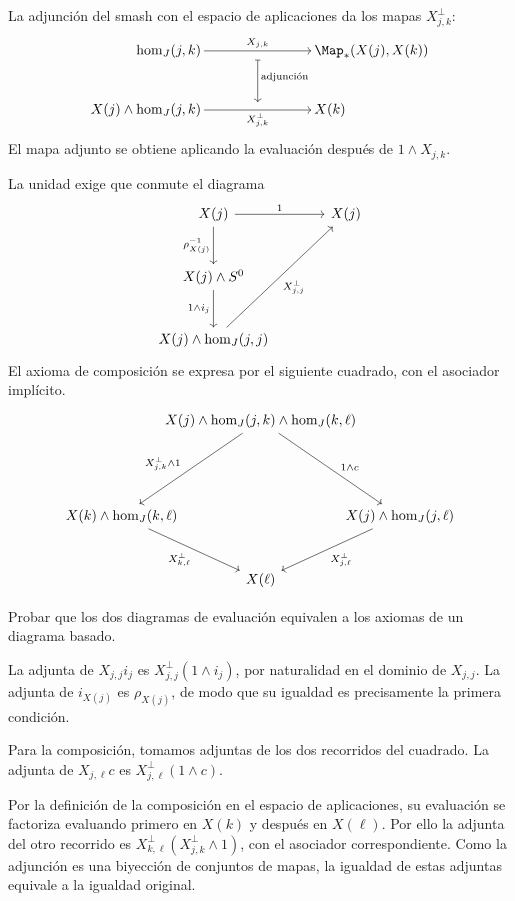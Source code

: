 La adjunción del smash con el espacio de aplicaciones da los mapas $X_{j,k}^\perp$:
\[
\begin{tikzcd}[column sep={13.5mm,between origins},row sep={15mm,between origins},
    cells={nodes={inner sep=2pt}}]
|[anchor=east]| \hom_J(j,k)\arrow[rr,start anchor=east,end anchor=west,"X_{j,k}"]
& {}\arrow[d,mapsto,start anchor=center,end anchor=center,shorten <=3.15mm,shorten >=1.1mm,
    "\text{adjunción}"]
& |[anchor=west]| \Map_*(X(j),X(k))\\
|[anchor=east]| X(j)\wedge\hom_J(j,k)
    \arrow[rr,start anchor=east,end anchor=west,"X_{j,k}^\perp"']
& {}
& |[anchor=west]| X(k)
\end{tikzcd}
\]
El mapa adjunto se obtiene aplicando la evaluación después de $1\wedge X_{j,k}$.

La unidad exige que conmute el diagrama
\[
\begin{tikzcd}[column sep=large,row sep=large]
X(j)\arrow[r,"1"]\arrow[d,"\rho_{X(j)}^{-1}"']&X(j)\\
X(j)\wedge S^0\arrow[d,"1\wedge i_j"']&\\
X(j)\wedge\hom_J(j,j)\arrow[uur,"X_{j,j}^{\perp}"']& {}
\end{tikzcd}
\]
El axioma de composición se expresa por el siguiente cuadrado, con el asociador implícito.
\[
\begin{tikzcd}[column sep={35mm,between origins},row sep={16mm,between origins}]
& X(j)\wedge\hom_J(j,k)\wedge\hom_J(k,\ell)
    \arrow[dl,"X_{j,k}^\perp\wedge1"'{pos=.57}]
    \arrow[dr,"1\wedge c"{pos=.57}]
&\\[8mm]
X(k)\wedge\hom_J(k,\ell)\arrow[dr,"X_{k,\ell}^\perp"']
&& X(j)\wedge\hom_J(j,\ell)\arrow[dl,"X_{j,\ell}^\perp"]\\
& X(\ell) &
\end{tikzcd}
\]

\begin{ejer}\label{ejer:c26-adjuntas-diagrama}
Probar que los dos diagramas de evaluación equivalen a los axiomas de un diagrama basado.
\end{ejer}
\begin{sol}
La adjunta de $X_{j,j}i_j$ es $X_{j,j}^{\perp}(1\wedge i_j)$, por naturalidad en el dominio de $X_{j,j}$. La adjunta de $i_{X(j)}$ es $\rho_{X(j)}$, de modo que su igualdad es precisamente la primera condición.

Para la composición, tomamos adjuntas de los dos recorridos del cuadrado. La adjunta de $X_{j,\ell}c$ es $X_{j,\ell}^{\perp}(1\wedge c)$.

Por la definición de la composición en el espacio de aplicaciones, su evaluación se factoriza evaluando primero en $X(k)$ y después en $X(\ell)$. Por ello la adjunta del otro recorrido es $X_{k,\ell}^{\perp}(X_{j,k}^{\perp}\wedge1)$, con el asociador correspondiente. Como la adjunción es una biyección de conjuntos de mapas, la igualdad de estas adjuntas equivale a la igualdad original.
\end{sol}

